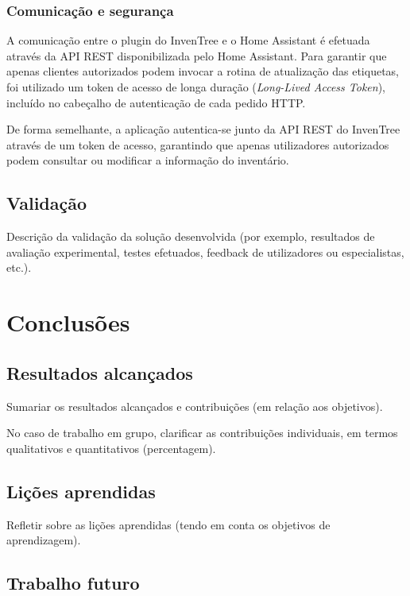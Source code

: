 \documentclass[10pt]{article}
\begin{document}
\subsubsection{Comunicação e segurança}

A comunicação entre o plugin do InvenTree e o Home Assistant é efetuada através da API REST disponibilizada pelo Home Assistant. Para garantir que apenas clientes autorizados podem invocar a rotina de atualização das etiquetas, foi utilizado um token de acesso de longa duração (\textit{Long-Lived Access Token}), incluído no cabeçalho de autenticação de cada pedido HTTP.

De forma semelhante, a aplicação autentica-se junto da API REST do InvenTree através de um token de acesso, garantindo que apenas utilizadores autorizados podem consultar ou modificar a informação do inventário.

\subsection{Validação}

Descrição da validação da solução desenvolvida (por exemplo, resultados de avaliação experimental, testes efetuados, feedback de utilizadores ou especialistas, etc.).


\section{Conclusões}


	
\subsection{Resultados alcançados} 	
 Sumariar os resultados alcançados e contribuições (em relação aos objetivos).
	
 No caso de trabalho em grupo, clarificar as contribuições individuais, em termos qualitativos e quantitativos (percentagem).
\subsection{Lições aprendidas} 	
 Refletir sobre as lições aprendidas (tendo em conta os objetivos de aprendizagem).
	
\subsection{Trabalho futuro} 
 
\end{document}
